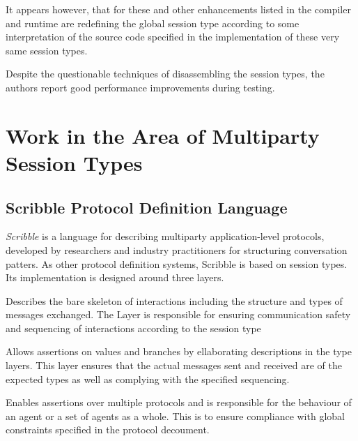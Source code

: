 It appears however, that for these and other enhancements listed in \cite{sess_type_guided_distr_interact} the compiler and runtime are redefining the global session type according to some interpretation of the source code specified in the implementation of these very same session types.

Despite the questionable techniques of disassembling the session types, the authors report good performance improvements during testing.   



\section{Work in the Area of Multiparty Session Types}
\label{sec:mpstarea}

\subsection*{Scribble Protocol Definition Language}

\textit{Scribble} \cite{scribble} is a language for describing multiparty application-level protocols, developed by researchers and industry practitioners for structuring conversation patters. As other protocol definition systems, Scribble is based on session types. Its implementation is designed around three layers.

\begin{packed_description}
\item [Type Layer] Describes the bare skeleton of interactions including the structure and types of messages exchanged. The Layer is responsible for ensuring communication safety and sequencing of interactions according to the session type

\item [Assertion Layer] Allows assertions on values and branches by ellaborating descriptions in the type layers. This layer ensures that the actual messages sent and received are of the expected types as well as complying with the specified sequencing. 

\item [Protocol Document Layer] Enables assertions over multiple protocols and is responsible for the behaviour of an agent or a set of agents as a whole. This is to ensure compliance with global constraints specified in the protocol decoument. 
\end{packed_description}


